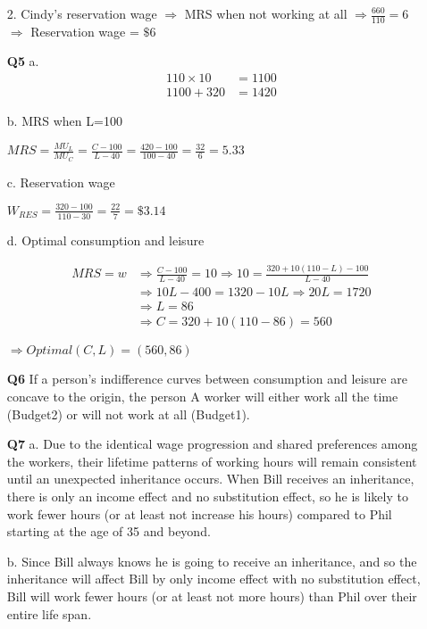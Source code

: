 \documentclass[12pt]{article}
\begin{document}
\begin{enumerate}
    2. Cindy's reservation wage $\Rightarrow$ MRS when not working at all $\Rightarrow \frac{660}{110} = 6$\\
    $\Rightarrow$ Reservation wage = $\$6$
    
    \item[\textbf{Q5}] 
    a. 
    \begin{align*} 
    110 \times 10 &=  1100 \\ 
    1100 + 320 &=  1420
    \end{align*}


    b. MRS when L=100

    $MRS = \frac{MU_L}{MU_C} = \frac{C - 100}{L-40} = \frac{420 - 100}{100 - 40} = \frac{32}{6} = 5.33$

    c. Reservation wage

    $W_{RES} = \frac{320 - 100}{110-30} = \frac{22}{7} = \$3.14$

    d. Optimal consumption and leisure

    \begin{align*}
            MRS = w &\Rightarrow \frac{C - 100}{L - 40} = 10 \Rightarrow 10 = \frac{320 + 10(110 - L) -100}{L - 40}\\ &\Rightarrow 10L - 400 = 1320 - 10L \Rightarrow 20L = 1720\\
            &\Rightarrow L = 86\\
            &\Rightarrow C = 320 + 10(110 - 86) = 560
    \end{align*}

    $\Rightarrow Optimal (C,L) = (560, 86)$

    \item[\textbf{Q6}] 
    If a person's indifference curves between consumption and leisure are concave to the origin, the person A worker will either work all the time (Budget2) or will not work at all (Budget1). 


        
    \item[\textbf{Q7}] 
    a. Due to the identical wage progression and shared preferences among the workers, their lifetime patterns of working hours will remain consistent until an unexpected inheritance occurs. When Bill receives an inheritance, there is only an income effect and no substitution effect, so he is likely to work fewer hours (or at least not increase his hours) compared to Phil starting at the age of 35 and beyond.



    b. Since Bill always knows he is going to receive an inheritance, and so the inheritance will affect Bill by only income effect with no substitution effect, Bill will work fewer hours (or at least not more hours) than Phil over their entire life span.




\end{enumerate}
\end{document}
